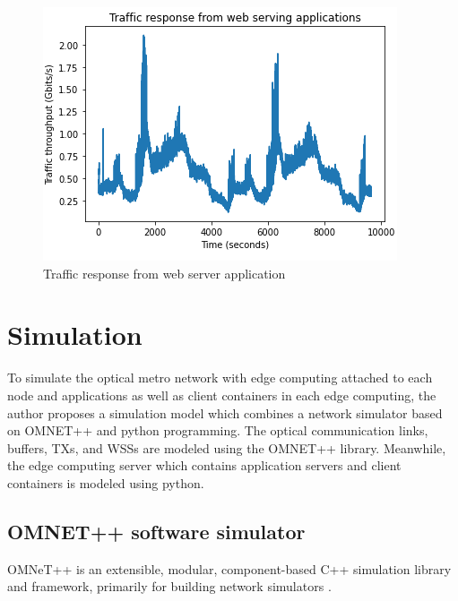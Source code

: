 \documentclass[conference]{IEEEtran}
\begin{document}
\begin{figure}[]
    \centering
        \includegraphics[scale = 0.8]{imgs/web_server_response.png}
        \caption{Traffic response from web server application}
        \label{fig:serving_resp}
    \end{figure}


\section{Simulation}
\label{sec:Simulation}

To simulate the optical metro network with edge computing attached to each node and applications as well as client containers in each edge computing, the author proposes a simulation model which combines a network simulator based on OMNET++ and python programming. The optical communication links, buffers, TXs, and WSSs are modeled using the OMNET++ library. Meanwhile, the edge computing server which contains application servers and client containers is modeled using python. 


\subsection{OMNET++ software simulator}
OMNeT++ is an extensible, modular, component-based C++ simulation library and framework, primarily for building network simulators \cite{andras_rudolf}.
\end{document}
